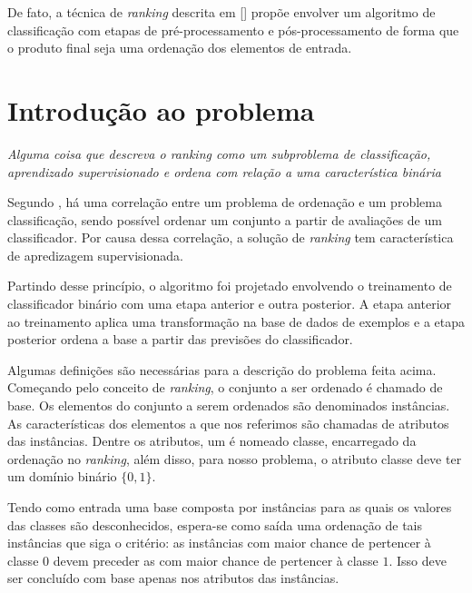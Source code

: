 De fato, a técnica de \emph{ranking} descrita em [\cite{langford08}] propõe envolver  um algoritmo de classificação com etapas de pré-processamento e pós-processamento de forma que o produto final seja uma ordenação dos elementos de entrada.

\section{Introdução ao problema}

\emph{Alguma coisa que descreva o ranking como um subproblema de classificação, aprendizado supervisionado e ordena com relação a uma característica binária}

Segundo \cite{langford08}, há uma correlação entre um problema de ordenação e um problema classificação, sendo possível ordenar um conjunto a partir de avaliações de um classificador. Por causa dessa correlação, a solução de \emph{ranking} tem característica de apredizagem supervisionada.

Partindo desse princípio, o algoritmo foi projetado envolvendo o treinamento de classificador binário com uma etapa anterior e outra posterior. A etapa anterior ao treinamento aplica uma transformação na base de dados de exemplos e a etapa posterior  ordena a base a partir das previsões do classificador.


Algumas definições são necessárias para a descrição do problema feita acima.
Começando pelo conceito de \emph{ranking}, o conjunto a ser ordenado é chamado
de base. Os elementos do conjunto a serem ordenados são denominados instâncias.
As características dos elementos a que nos referimos são chamadas de atributos
das instâncias. Dentre os atributos, um é nomeado classe, encarregado da
ordenação no \emph{ranking}, além disso, para nosso problema, o atributo classe
deve ter um domínio binário $\{0, 1\}$.

Tendo como entrada uma base composta por instâncias para as quais os valores
das classes são desconhecidos, espera-se como saída uma ordenação de tais
instâncias que siga o critério: as instâncias com maior chance de pertencer à
classe $0$ devem preceder as com maior chance de pertencer à classe $1$. Isso
deve ser concluído com base apenas nos atributos das instâncias.

